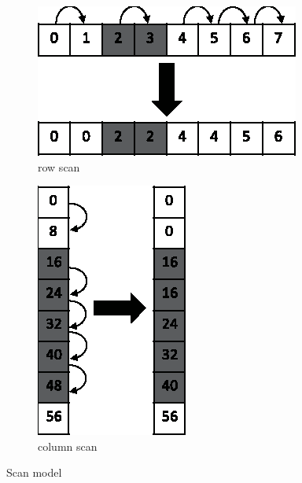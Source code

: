 \documentclass[a4paper, 11pt]{article}
\begin{document}
\begin{figure}[H]
	\centering
	\begin{subfigure}[b]{0.3\textwidth}
		\includegraphics[width=\textwidth]{images/cuda_uf/uf_3.eps}
		\caption{row scan}
		\label{fig:cuda_uf_3}
	\end{subfigure}
	\hspace{5mm} 
	\begin{subfigure}[b]{0.3\textwidth}
		\hspace{9mm} 
		\includegraphics[height=\textwidth]{images/cuda_uf/uf_4.eps}
		\caption{column scan}
		\label{fig:cuda_uf_4}
	\end{subfigure}
	\caption{Scan model}
\end{figure}
\end{document}

